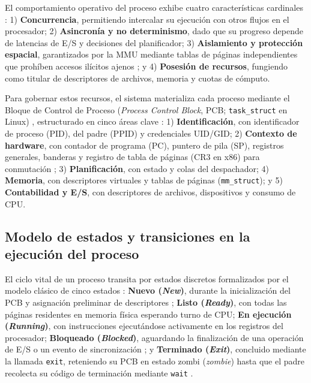 \documentclass[12pt]{article}
\begin{document}
El comportamiento operativo del proceso exhibe cuatro características cardinales \parencite[\S 3.1, p.\ 97]{carretero2001sistemas}: 1) \textbf{Concurrencia}, permitiendo intercalar su ejecución con otros flujos en el procesador; 2) \textbf{Asincronía y no determinismo}, dado que su progreso depende de latencias de E/S y decisiones del planificador; 3) \textbf{Aislamiento y protección espacial}, garantizados por la MMU mediante tablas de páginas independientes que prohíben accesos ilícitos ajenos \parencite[\S 3.1, p.\ 132]{stallings2018operating}; y 4) \textbf{Posesión de recursos}, fungiendo como titular de descriptores de archivos, memoria y cuotas de cómputo.

Para gobernar estos recursos, el sistema materializa cada proceso mediante el Bloque de Control de Proceso (\textit{Process Control Block}, PCB; \texttt{task\_struct} en Linux) \parencite[\S 3.1.3, p.\ 75]{silberschatz2006fundamentos}, estructurado en cinco áreas clave \parencite[\S 3.3, p.\ 152]{stallings2018operating}: 1) \textbf{Identificación}, con identificador de proceso (PID), del padre (PPID) y credenciales UID/GID; 2) \textbf{Contexto de hardware}, con contador de programa (PC), puntero de pila (SP), registros generales, banderas y registro de tabla de páginas (CR3 en x86) para conmutación \parencite[\S 3.1.3, p.\ 76]{silberschatz2006fundamentos}; 3) \textbf{Planificación}, con estado y colas del despachador; 4) \textbf{Memoria}, con descriptores virtuales y tablas de páginas (\texttt{mm\_struct}); y 5) \textbf{Contabilidad y E/S}, con descriptores de archivos, dispositivos y consumo de CPU.

\subsection{Modelo de estados y transiciones en la ejecución del proceso}

El ciclo vital de un proceso transita por estados discretos formalizados por el modelo clásico de cinco estados \parencite[\S 3.2, p.\ 133]{stallings2018operating}: \textbf{Nuevo (\textit{New})}, durante la inicialización del PCB y asignación preliminar de descriptores \parencite[\S 3.1.2, p.\ 74]{silberschatz2006fundamentos}; \textbf{Listo (\textit{Ready})}, con todas las páginas residentes en memoria física esperando turno de CPU; \textbf{En ejecución (\textit{Running})}, con instrucciones ejecutándose activamente en los registros del procesador; \textbf{Bloqueado (\textit{Blocked})}, aguardando la finalización de una operación de E/S o un evento de sincronización \parencite[\S 3.5, p.\ 115]{carretero2001sistemas}; y \textbf{Terminado (\textit{Exit})}, concluido mediante la llamada \texttt{exit}, reteniendo su PCB en estado zombi (\textit{zombie}) hasta que el padre recolecta su código de terminación mediante \texttt{wait} \parencite[\S 3.3.2, p.\ 85]{silberschatz2006fundamentos}.
\end{document}
